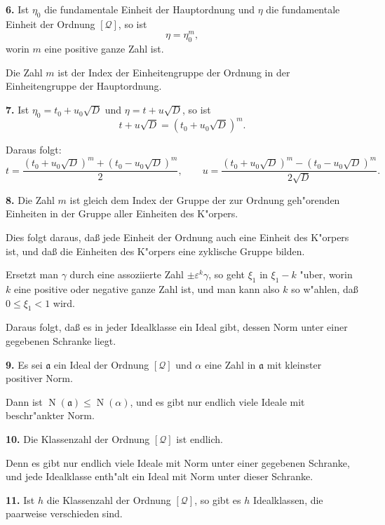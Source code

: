 \documentclass[11pt,a4paper]{article}
\theoremstyle{plain}
\DeclareMathOperator{\Norm}{N}
\begin{document}
\textbf{6.} Ist $\eta_0$ die fundamentale Einheit der Hauptordnung und $\eta$ die fundamentale Einheit der Ordnung $[\mathcal{Q}]$, so ist
\[
\eta = \eta_0^m,
\]
worin $m$ eine positive ganze Zahl ist.

Die Zahl $m$ ist der Index der Einheitengruppe der Ordnung in der Einheitengruppe der Hauptordnung.

\smallskip

\textbf{7.} Ist $\eta_0 = t_0 + u_0\sqrt{D}$ und $\eta = t + u\sqrt{D}$, so ist
\[
t + u\sqrt{D} = (t_0 + u_0\sqrt{D})^m.
\]

Daraus folgt:
\[
t = \frac{(t_0 + u_0\sqrt{D})^m + (t_0 - u_0\sqrt{D})^m}{2}, \qquad
u = \frac{(t_0 + u_0\sqrt{D})^m - (t_0 - u_0\sqrt{D})^m}{2\sqrt{D}}.
\]

\smallskip

\textbf{8.} Die Zahl $m$ ist gleich dem Index der Gruppe der zur Ordnung geh"{o}renden Einheiten in der Gruppe aller Einheiten des K"{o}rpers.

Dies folgt daraus, da\ss{} jede Einheit der Ordnung auch eine Einheit des K"{o}rpers ist, und da\ss{} die Einheiten des K"{o}rpers eine zyklische Gruppe bilden.

\newpage
\setcounter{page}{401}

Ersetzt man $\gamma$ durch eine assoziierte Zahl $\pm\varepsilon^k\gamma$, so geht $\xi_1$ in $\xi_1 - k$ "{u}ber, worin $k$ eine positive oder negative ganze Zahl ist, und man kann also $k$ so w"{a}hlen, da\ss{} $0 \leq \xi_1 < 1$ wird.

Daraus folgt, da\ss{} es in jeder Idealklasse ein Ideal gibt, dessen Norm unter einer gegebenen Schranke liegt.

\smallskip

\textbf{9.} Es sei $\mathfrak{a}$ ein Ideal der Ordnung $[\mathcal{Q}]$ und $\alpha$ eine Zahl in $\mathfrak{a}$ mit kleinster positiver Norm.

Dann ist $\Norm(\mathfrak{a}) \leq \Norm(\alpha)$, und es gibt nur endlich viele Ideale mit beschr"{a}nkter Norm.

\smallskip

\textbf{10.} Die Klassenzahl der Ordnung $[\mathcal{Q}]$ ist endlich.

Denn es gibt nur endlich viele Ideale mit Norm unter einer gegebenen Schranke, und jede Idealklasse enth"{a}lt ein Ideal mit Norm unter dieser Schranke.

\smallskip

\textbf{11.} Ist $h$ die Klassenzahl der Ordnung $[\mathcal{Q}]$, so gibt es $h$ Idealklassen, die paarweise verschieden sind.
\end{document}
